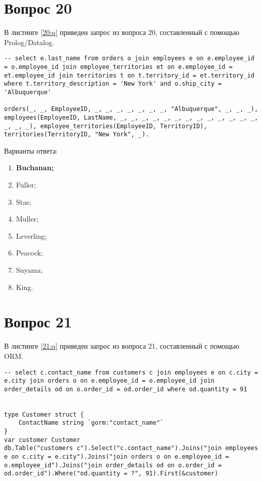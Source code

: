 \begin{appendices}
\section{Вопрос 20}

В листинге \ref{20:q} приведен запрос из вопроса 20, составленный с помощью Prolog/Datalog.

\begin{lstlisting}[label=20:q,caption=Вопрос 20]
-- select e.last_name from orders o join employees e on e.employee_id = o.employee_id join employee_territories et on e.employee_id = et.employee_id join territories t on t.territory_id = et.territory_id where t.territory_description = 'New York' and o.ship_city = 'Albuquerque'

orders(_, _, EmployeeID, _, _, _, _, _, _, _, "Albuquerque", _, _, _), employees(EmployeeID, LastName, _, _, _, _, _, _, _, _, _, _, _, _, _, _, _, _), employee_territories(EmployeeID, TerritoryID), territories(TerritoryID, "New York", _).
\end{lstlisting}

Варианты ответа:

\begin{enumerate}
	\item \textbf{Buchanan;}
	\item Fuller;
	\item Stas;
	\item Muller;
	\item Leverling;
	\item Peacock;
	\item Suyama;
	\item King.
\end{enumerate}

\section{Вопрос 21}

В листинге \ref{21:q} приведен запрос из вопроса 21, составленный с помощью ORM.

\begin{lstlisting}[label=21:q,caption=Вопрос 21]
-- select c.contact_name from customers c join employees e on c.city = e.city join orders o on e.employee_id = o.employee_id join order_details od on o.order_id = od.order_id where od.quantity = 91


type Customer struct {
	ContactName string `gorm:"contact_name"`
}
var customer Customer
db.Table("customers c").Select("c.contact_name").Joins("join employees e on c.city = e.city").Joins("join orders o on e.employee_id = o.employee_id").Joins("join order_details od on o.order_id = od.order_id").Where("od.quantity = ?", 91).First(&customer)
\end{lstlisting}


\end{appendices}
